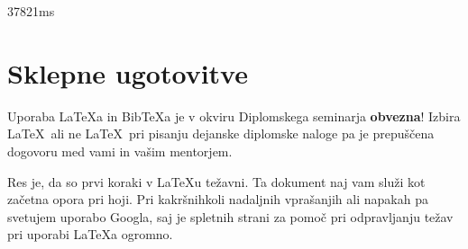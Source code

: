 \documentclass[a4paper, 12p]{book}
\newcommand{\BibTeX}{{\sc Bib}\TeX}
\begin{document}
37821ms

\chapter{Sklepne ugotovitve}

Uporaba \LaTeX{a} in \BibTeX{a} je v okviru Diplomskega seminarja \textbf{obvezna}!
Izbira \LaTeX\ ali ne \LaTeX\ pri pisanju dejanske diplomske naloge pa je pre\-pu\-šče\-na dogovoru med vami in vašim mentorjem.

Res je, da so prvi koraki v \LaTeX{}u težavni. 
Ta dokument naj vam služi kot začetna opora pri hoji.
Pri kakršnihkoli nadaljnih vprašanjih ali napakah pa svetujem uporabo Googla, saj je spletnih strani za pomoč pri odpravljanju težav pri uporabi \LaTeX{}a ogromno.


\newpage %

\clearpage
{}


\end{document}
